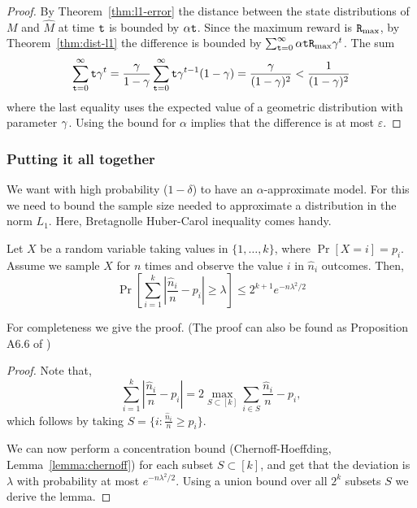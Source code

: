\begin{proof}
By Theorem~\ref{thm:l1-error} the distance between the state distributions of $M$ and $\widehat{M}$ at time ${\tt t}$ is bounded by $\alpha{\tt t}$. Since the maximum reward  is ${\tt R}_{\max }$, by Theorem~\ref{thm:dist-l1} the difference is bounded by
$\sum_{{\tt t}=0}^\infty \alpha{\tt t} {\tt R}_{\max }\gamma^t$.
The sum 
$$\sum_{{\tt t}=0}^\infty {\tt t} \gamma^t=\frac{\gamma}{1-\gamma}\sum_{{\tt t}=0}^\infty {\tt t} \gamma^{t-1}(1-\gamma)=\frac{\gamma}{(1-\gamma)^2}< \frac{1}{(1-\gamma)^2}$$
where the last equality uses the expected value of a geometric distribution with parameter $\gamma$.
%
Using the bound for $\alpha$ implies that the difference is at most $\varepsilon$.
%
\end{proof}

\subsubsection{Putting it all together}

We want with high probability ($1-\delta$) to have an
$\alpha$-approximate model. For this we need to bound the sample
size needed to approximate a distribution in the norm $L_1$. Here,
Bretagnolle Huber-Carol inequality comes handy.

\begin{lemma}
\label{lemma:Bretagnolle Huber-Carol}
Let $X$ be a random variable taking values in $\{1, \ldots , k\}$,
where $\Pr[X=i]=p_i$. Assume we sample $X$ for $n$ times and
observe the value $i$ in $\hat{n}_i$ outcomes. Then,
\[
\Pr[\sum_{i=1}^k \left|\frac{\hat{n}_i}{n}-p_i\right|\geq
\lambda]\leq 2^{k+1} e^{-n\lambda^2/2}
\]
\end{lemma}

For completeness we give the proof. (The proof can also be found as
Proposition A6.6 of %
\cite{van1996weak})
\begin{proof}
Note that,
\[
\sum_{i=1}^k |\frac{\hat{n}_i}{n}-p_i| = 2\max_{S\subset [k]}
\sum_{i\in S} \frac{\hat{n}_i}{n}-p_i,
\]
which follows by taking $S=\{i:\frac{\hat{n}_i}{n}\geq p_i\}$.

We can now perform a concentration bound (Chernoff-Hoeffding, Lemma~\ref{lemma:chernoff}) for
each subset $S\subset [k]$, and get that the deviation is $\lambda$
with probability at most $e^{-n\lambda^2/2}$. Using a union bound
over all $2^k$ subsets $S$ we
 derive the lemma.
\end{proof}

